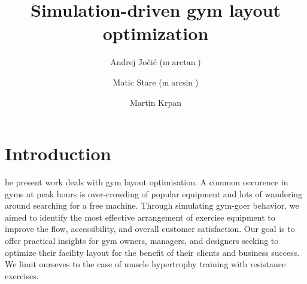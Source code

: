 \documentclass[9pt]{pnas-new}
\title{Simulation-driven gym layout optimization}
\author{Andrej Jočić (m$\arctan$)}
\author{Matic Stare (m$\arcsin$)}
\author{Martin Krpan}
\affil{Collective behaviour course research seminar report}
\begin{document}
\verticaladjustment{-2pt}

\maketitle
\thispagestyle{firststyle}

\section*{Introduction}
he present work deals with gym layout optimisation.
A common occurence in gyms at peak hours is over-crowding of popular equipment and lots of wandering around searching for a free machine.
Through simulating gym-goer behavior, we aimed to identify the most effective arrangement of exercise equipment to improve the flow, accessibility, and overall customer satisfaction.
Our goal is to offer practical insights for gym owners, managers, and designers seeking to optimize their facility layout for the benefit of their clients and business success.
We limit ourseves to the case of muscle hypertrophy training with resistance exercises.
\end{document}
